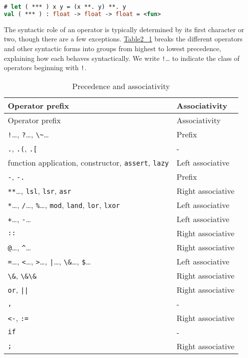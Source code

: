 \begin{lstlisting}[language=Caml]
# let ( *** ) x y = (x **. y) **. y
val ( *** ) : float -> float -> float = <fun>
\end{lstlisting}

The syntactic role of an operator is typically determined by its first
character or two, though there are a few exceptions.
\href{variables-and-functions.html\#table2_1}{Table2\_1} breaks the
different operators and other syntactic forms into groups from highest
to lowest precedence, explaining how each behaves syntactically. We
write \passthrough{\lstinline"!"}\ldots{} to indicate the class of
operators beginning with \passthrough{\lstinline"!"}.

\hypertarget{table2_1}{}
\begin{longtable}[]{@{}ll@{}}
\caption{Precedence and associativity}\tabularnewline
\toprule
Operator prefix & Associativity\tabularnewline
\midrule
\endfirsthead
\toprule
Operator prefix & Associativity\tabularnewline
\midrule
\endhead
\passthrough{\lstinline"!"}\ldots, \passthrough{\lstinline!?!}\ldots,
\passthrough{\lstinline!\~!}\ldots{} & Prefix\tabularnewline
\passthrough{\lstinline!.!}, \passthrough{\lstinline!.(!},
\passthrough{\lstinline!.[!} & -\tabularnewline
function application, constructor, \passthrough{\lstinline!assert!},
\passthrough{\lstinline!lazy!} & Left associative\tabularnewline
\passthrough{\lstinline!-!}, \passthrough{\lstinline!-.!} &
Prefix\tabularnewline
\passthrough{\lstinline!**!}\ldots, \passthrough{\lstinline!lsl!},
\passthrough{\lstinline!lsr!}, \passthrough{\lstinline!asr!} & Right
associative\tabularnewline
\passthrough{\lstinline!*!}\ldots, \passthrough{\lstinline!/!}\ldots,
\passthrough{\lstinline!\%!}\ldots, \passthrough{\lstinline!mod!},
\passthrough{\lstinline!land!}, \passthrough{\lstinline!lor!},
\passthrough{\lstinline!lxor!} & Left associative\tabularnewline
\passthrough{\lstinline!+!}\ldots, \passthrough{\lstinline!-!}\ldots{} &
Left associative\tabularnewline
\passthrough{\lstinline!::!} & Right associative\tabularnewline
\passthrough{\lstinline!@!}\ldots, \passthrough{\lstinline!^!}\ldots{} &
Right associative\tabularnewline
\passthrough{\lstinline!=!}\ldots, \passthrough{\lstinline!<!}\ldots,
\passthrough{\lstinline!>!}\ldots, \passthrough{\lstinline!|!}\ldots,
\passthrough{\lstinline!\&!}\ldots, \passthrough{\lstinline!$!}\ldots{}
& Left associative\tabularnewline
\passthrough{\lstinline!\&!}, \passthrough{\lstinline!\&\&!} & Right
associative\tabularnewline
\passthrough{\lstinline!or!}, \passthrough{\lstinline!||!} & Right
associative\tabularnewline
\passthrough{\lstinline!,!} & -\tabularnewline
\passthrough{\lstinline!<-!}, \passthrough{\lstinline!:=!} & Right
associative\tabularnewline
\passthrough{\lstinline!if!} & -\tabularnewline
\passthrough{\lstinline!;!} & Right associative\tabularnewline
\bottomrule
\end{longtable}

